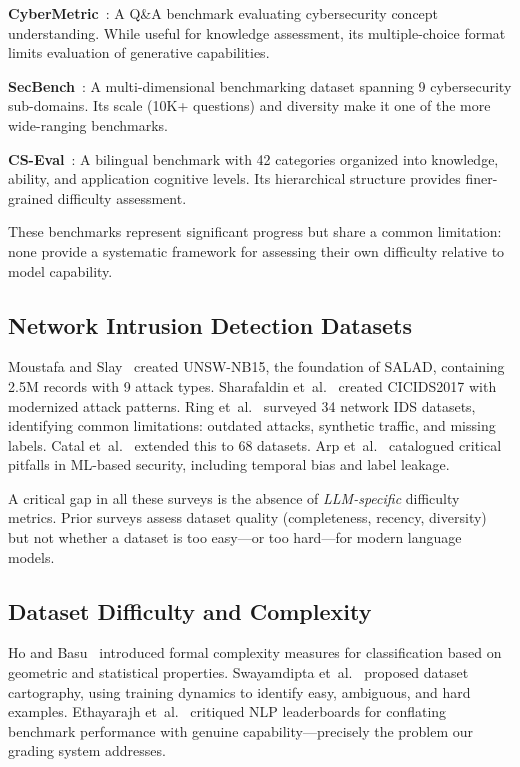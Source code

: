 \documentclass[journal]{IEEEtran}
\begin{document}
\textbf{CyberMetric}~\cite{tihanyi2024}: A Q\&A benchmark evaluating cybersecurity concept understanding. While useful for knowledge assessment, its multiple-choice format limits evaluation of generative capabilities.

\textbf{SecBench}~\cite{liu2024secbench}: A multi-dimensional benchmarking dataset spanning 9 cybersecurity sub-domains. Its scale (10K+ questions) and diversity make it one of the more wide-ranging benchmarks.

\textbf{CS-Eval}~\cite{cseval2024}: A bilingual benchmark with 42 categories organized into knowledge, ability, and application cognitive levels. Its hierarchical structure provides finer-grained difficulty assessment.

These benchmarks represent significant progress but share a common limitation: none provide a systematic framework for assessing their own difficulty relative to model capability.

\subsection{Network Intrusion Detection Datasets}
Moustafa and Slay~\cite{moustafa2016} created UNSW-NB15, the foundation of SALAD, containing 2.5M records with 9 attack types. Sharafaldin et~al.~\cite{sharafaldin2018} created CICIDS2017 with modernized attack patterns. Ring et~al.~\cite{ring2019} surveyed 34 network IDS datasets, identifying common limitations: outdated attacks, synthetic traffic, and missing labels. Catal et~al.~\cite{catal2022} extended this to 68 datasets. Arp et~al.~\cite{arp2022} catalogued critical pitfalls in ML-based security, including temporal bias and label leakage.

A critical gap in all these surveys is the absence of \emph{LLM-specific} difficulty metrics. Prior surveys assess dataset quality (completeness, recency, diversity) but not whether a dataset is too easy---or too hard---for modern language models.

\subsection{Dataset Difficulty and Complexity}
Ho and Basu~\cite{ho2002} introduced formal complexity measures for classification based on geometric and statistical properties. Swayamdipta et~al.~\cite{swayamdipta2020} proposed dataset cartography, using training dynamics to identify easy, ambiguous, and hard examples. Ethayarajh et~al.~\cite{ethayarajh2022} critiqued NLP leaderboards for conflating benchmark performance with genuine capability---precisely the problem our grading system addresses.
\end{document}

